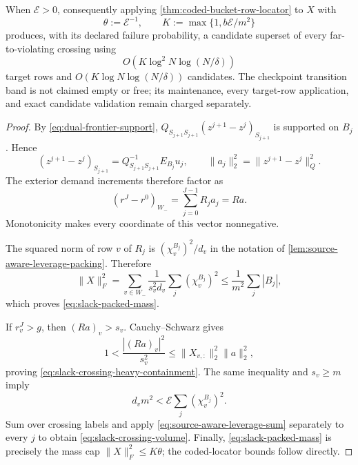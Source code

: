 \begin{theorem}
When $\mathcal E>0$, consequently applying
\cref{thm:coded-bucket-row-locator} to $X$ with
\begin{equation*}
 \theta:=\mathcal E^{-1},
 \qquad
 K:=\max\{1,b\mathcal E/m^2\}
\end{equation*}
produces, with its declared failure probability, a candidate superset of
every far-to-violating crossing using
\begin{equation}
 O\!\left(
  K\log^2N\log(N/\delta)
 \right)
 \label{eq:slack-packed-target-rows}
\end{equation}
target rows and
$O(K\log N\log(N/\delta))$ candidates.  The checkpoint transition band is
not claimed empty or free; its maintenance, every target-row application,
and exact candidate validation remain charged separately.
\end{theorem}

\begin{proof}
By \cref{eq:dual-frontier-support},
$Q_{S_{j+1}S_{j+1}}(z^{j+1}-z^j)_{S_{j+1}}$ is supported on $B_j$.
Hence
\begin{equation*}
 (z^{j+1}-z^j)_{S_{j+1}}
 =Q_{S_{j+1}S_{j+1}}^{-1}E_{B_j}u_j,
 \qquad
 \|a_j\|_2^2=\|z^{j+1}-z^j\|_Q^2.
\end{equation*}
The exterior demand increments therefore factor as
\begin{equation}
 (r^J-r^0)_{W_-}
 =\sum_{j=0}^{J-1}R_ja_j
 =Ra.
 \label{eq:slack-packed-demand-factor}
\end{equation}
Monotonicity makes every coordinate of this vector nonnegative.

The squared norm of row $v$ of $R_j$ is
$(\chi_v^{B_j})^2/d_v$ in the notation of
\cref{lem:source-aware-leverage-packing}.  Therefore
\begin{equation*}
 \|X\|_F^2
 =\sum_{v\in W_-}\frac1{s_v^2d_v}
   \sum_j(\chi_v^{B_j})^2
 \leq\frac1{m^2}\sum_j|B_j|,
\end{equation*}
which proves \cref{eq:slack-packed-mass}.

If $r_v^J>g$, then
$(Ra)_v>s_v$.  Cauchy--Schwarz gives
\begin{equation*}
 1<\frac{|(Ra)_v|^2}{s_v^2}
 \leq\|X_{v,:}\|_2^2\|a\|_2^2,
\end{equation*}
proving \cref{eq:slack-crossing-heavy-containment}.  The same inequality and
$s_v\geq m$ imply
\begin{equation*}
 d_vm^2
 <\mathcal E\sum_j(\chi_v^{B_j})^2.
\end{equation*}
Sum over crossing labels and apply
\cref{eq:source-aware-leverage-sum} separately to every $j$ to obtain
\cref{eq:slack-crossing-volume}.  Finally,
\cref{eq:slack-packed-mass} is precisely the mass cap
$\|X\|_F^2\leq K\theta$; the coded-locator bounds follow directly.
\end{proof}

